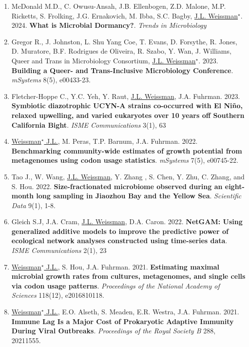 \documentclass[]{res}
\begin{document}
\begin{resume}
\begin{enumerate}[leftmargin=*]
 \item McDonald M.D., C. Owusu-Ansah, J.B. Ellenbogen, Z.D. Malone, M.P. Ricketts, S. Frolking, J.G. Ernakovich, M. Ibba, S.C. Bagby, \underline{J.L. Weissman$^\star$}. 2024. {\bf What is Microbial Dormancy?}. \emph{Trends in Microbiology}

 \item Gregor R., J. Johnston, L. Shu Yang Coe, T. Evans, D. Forsythe, R. Jones, D. Muratore, B.F. Rodrigues de Oliveira, R. Szabo, Y. Wan, J. Williams, Queer and Trans in Microbiology Consortium, \underline{J.L. Weissman$^\star$}. 2023. {\bf Building a Queer- and Trans-Inclusive Microbiology Conference}. \emph{mSystems} 8(5), e00433-23.
 
\item Fletcher-Hoppe C., Y.C. Yeh, Y. Raut, \underline{J.L. Weissman}, J.A. Fuhrman. 2023. {\bf Symbiotic diazotrophic UCYN-A strains co-occurred with El Niño, relaxed upwelling, and varied eukaryotes over 10 years off Southern California Bight}. \emph{ISME Communications} 3(1), 63
 
 
  \item \underline{Weissman$^\star$ J.L.}, M. Peras, T.P. Barnum, J.A. Fuhrman. 2022. {\bf Benchmarking community-wide estimates of growth potential from metagenomes using codon usage statistics}. \emph{mSystems} 7(5), e00745-22.
  
    \item  Tao J., W. Wang, \underline{J.L. Weissman}, Y. Zhang , S. Chen, Y. Zhu, C. Zhang, and S. Hou. 2022. {\bf Size-fractionated microbiome observed during an eight-month long sampling in Jiaozhou Bay and the Yellow Sea}. \emph{Scientific Data} 9(1), 1-8.
 
 \item Gleich S.J, J.A. Cram, \underline{J.L. Weissman}, D.A. Caron. 2022. {\bf NetGAM: Using generalized additive models to improve the predictive power of ecological network analyses constructed using time-series data}. \emph{ISME Communications} 2(1), 23
 
\item \underline{Weissman$^\star$ J.L.}, S. Hou, J.A. Fuhrman. 2021. {\bf Estimating maximal microbial growth rates from cultures, metagenomes, and single cells via codon usage patterns}. \emph{Proceedings of the National Academy of Sciences} 118(12), e2016810118. 
 
\item \underline{Weissman$^\star$ J.L.}, E.O. Alseth, S. Meaden, E.R. Westra, J.A. Fuhrman. 2021. {\bf Immune Lag Is a Major Cost of Prokaryotic Adaptive Immunity During Viral Outbreaks}. \emph{Proceedings of the Royal Society B} 288, 20211555.


\end{enumerate}
\end{resume}
\end{document}
